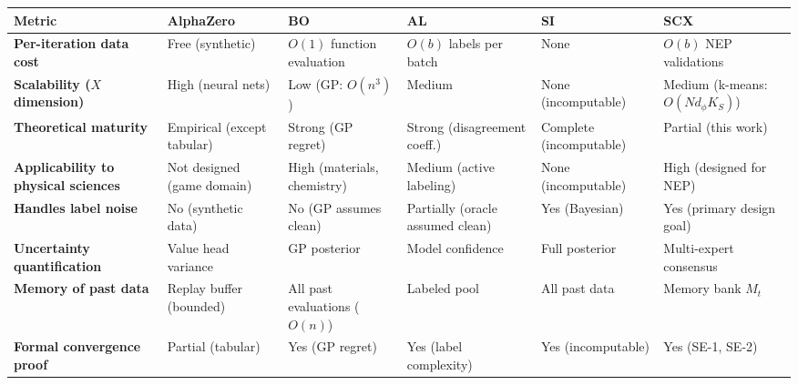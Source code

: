 \documentclass[
  12pt,
]{article}
\begin{document}
\begin{longtable}[]{@{}
  >{\raggedright\arraybackslash}p{}
  >{\raggedright\arraybackslash}p{}
  >{\raggedright\arraybackslash}p{}
  >{\raggedright\arraybackslash}p{}
  >{\raggedright\arraybackslash}p{}
  >{\raggedright\arraybackslash}p{}@{}}
\toprule\noalign{}
\begin{minipage}[b]{\linewidth}\raggedright
Metric
\end{minipage} & \begin{minipage}[b]{\linewidth}\raggedright
AlphaZero
\end{minipage} & \begin{minipage}[b]{\linewidth}\raggedright
BO
\end{minipage} & \begin{minipage}[b]{\linewidth}\raggedright
AL
\end{minipage} & \begin{minipage}[b]{\linewidth}\raggedright
SI
\end{minipage} & \begin{minipage}[b]{\linewidth}\raggedright
SCX
\end{minipage} \\
\midrule\noalign{}
\endhead
\bottomrule\noalign{}
\endlastfoot
\textbf{Per-iteration data cost} & Free (synthetic) & \(O(1)\) function
evaluation & \(O(b)\) labels per batch & None & \(O(b)\) NEP
validations \\
\textbf{Scalability (\(X\) dimension)} & High (neural nets) & Low (GP:
\(O(n^3)\)) & Medium & None (incomputable) & Medium (k-means:
\(O(N d_\phi K_S)\)) \\
\textbf{Theoretical maturity} & Empirical (except tabular) & Strong (GP
regret) & Strong (disagreement coeff.) & Complete (incomputable) &
Partial (this work) \\
\textbf{Applicability to physical sciences} & Not designed (game domain)
& High (materials, chemistry) & Medium (active labeling) & None
(incomputable) & High (designed for NEP) \\
\textbf{Handles label noise} & No (synthetic data) & No (GP assumes
clean) & Partially (oracle assumed clean) & Yes (Bayesian) & Yes
(primary design goal) \\
\textbf{Uncertainty quantification} & Value head variance & GP posterior
& Model confidence & Full posterior & Multi-expert consensus \\
\textbf{Memory of past data} & Replay buffer (bounded) & All past
evaluations (\(O(n)\)) & Labeled pool & All past data & Memory bank
\(M_t\) \\
\textbf{Formal convergence proof} & Partial (tabular) & Yes (GP regret)
& Yes (label complexity) & Yes (incomputable) & Yes (SE-1, SE-2) \\
\end{longtable}
\end{document}
